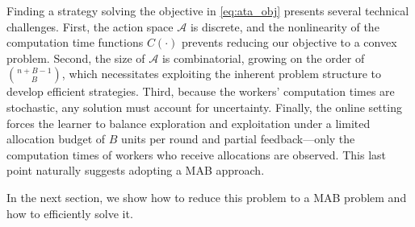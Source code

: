 
Finding a strategy solving the objective in \eqref{eq:ata_obj} presents several technical challenges. First, the action space $\mathcal{A}$ is discrete, and the nonlinearity of the computation time functions $C(\cdot)$ prevents reducing our objective to a convex problem. Second, the size of $\mathcal{A}$ is combinatorial, growing on the order of $\binom{n + B - 1}{B}$, which necessitates exploiting the inherent problem structure to develop efficient strategies. Third, because the workers' computation times are stochastic, any solution must account for uncertainty. Finally, the online setting forces the learner to balance exploration and exploitation under a limited allocation budget of $B$ units per round and partial feedback---only the computation times of workers who receive allocations are observed. This last point naturally suggests adopting a MAB approach.

In the next section, we show how to reduce this problem to a MAB problem and how to efficiently solve it.

